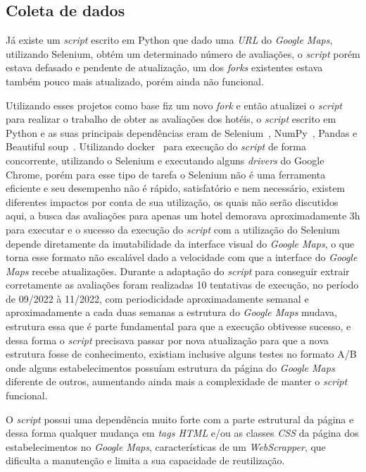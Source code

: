 \subsection{Coleta de dados}
\label{cap:metodologia:sec:conjunto_dados:sec:coleta_review}

Já existe um \emph{script} escrito em Python \cite{gaspa93scrapper2023} que dado uma \emph{URL} do \textit{Google Maps}, utilizando Selenium, obtém um determinado número de avaliações, o \emph{script} porém estava defasado e pendente de atualização, um dos \emph{forks} existentes  estava também pouco mais atualizado, porém ainda não funcional.

Utilizando esses projetos como base fiz um novo \emph{fork} e então atualizei o \emph{script} para realizar o trabalho de obter as avaliações dos hotéis, o \emph{script} escrito em Python e as suas principais dependências eram de Selenium~\cite{selenium2023}, NumPy~\cite{harris2020array}, Pandas\cite{jeffreback20226702671} e Beautiful soup~\cite{richardson2007beautiful}. Utilizando docker~\cite{merkel2014docker} para execução do \emph{script} de forma concorrente, utilizando o Selenium e executando alguns \textit{drivers} do Google Chrome, porém para esse tipo de tarefa o Selenium não é uma ferramenta eficiente e seu desempenho não é rápido, satisfatório e nem necessário, existem diferentes impactos por conta de sua utilização, os quais não serão discutidos aqui, a busca das avaliações para apenas um hotel demorava aproximadamente 3h para executar e o sucesso da execução do \emph{script} com a utilização do Selenium depende diretamente da imutabilidade da interface visual do \textit{Google Maps}, o que torna esse formato não escalável dado a velocidade com que a interface do \textit{Google Maps} recebe atualizações. Durante a adaptação do \emph{script} para conseguir extrair corretamente as avaliações foram realizadas 10 tentativas de execução, no período de 09/2022 à 11/2022, com periodicidade aproximadamente semanal e aproximadamente a cada duas semanas a estrutura do \textit{Google Maps} mudava, estrutura essa que é parte fundamental para que a execução obtivesse sucesso, e dessa forma o \emph{script} precisava passar por nova atualização para que a nova estrutura fosse de conhecimento, existiam inclusive alguns testes no formato A/B onde alguns estabelecimentos possuíam estrutura da página do \textit{Google Maps} diferente de outros, aumentando ainda mais a complexidade de manter o \emph{script} funcional.

O \emph{script} possui uma dependência muito forte com a parte estrutural da página e dessa forma qualquer mudança em \emph{tags HTML} e/ou as classes \emph{CSS} da página dos estabelecimentos no \textit{Google Maps}, características de um \emph{WebScrapper}, que dificulta a manutenção e limita a sua capacidade de reutilização.

